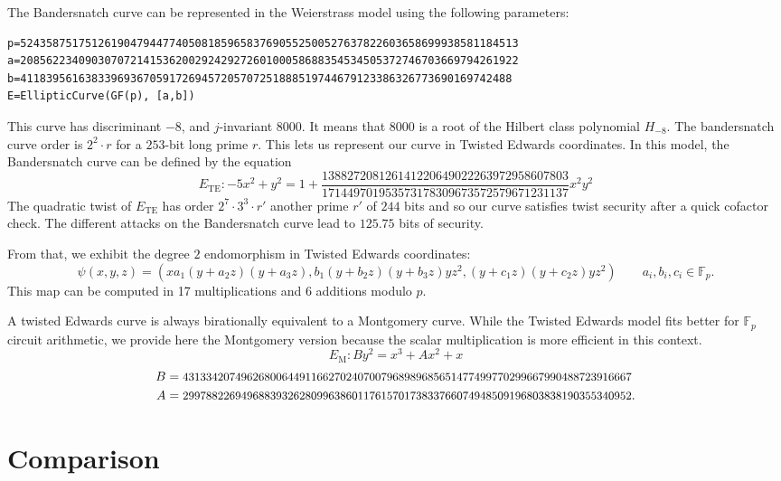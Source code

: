 \documentclass{amsart}
\newcommand{\Fp}{\ensuremath{\mathbb F_p}}
\begin{document}
The Bandersnatch curve can be represented in the Weierstrass model
using the following parameters:
\begin{verbatim}
p=52435875175126190479447740508185965837690552500527637822603658699938581184513
a=20856223409030707214153620029242927260100058688354534505372746703669794261922
b=4118395616383396936705917269457205707251888519744679123386326773690169742488
E=EllipticCurve(GF(p), [a,b])
\end{verbatim}
This curve has discriminant $-8$, and $j$-invariant $8000$. It means
that $8000$ is a root of the Hilbert class polynomial $H_{-8}$.
The bandersnatch curve order is $2^2\cdot r$ for a $253$-bit long
prime $r$.
This lets us represent our curve in Twisted Edwards coordinates.
In this model, the Bandersnatch curve can be defined by the equation
$$E_\text{TE}:-5x^2+y^2 = 1 + \frac{138827208126141220649022263972958607803}{171449701953573178309673572579671231137}x^2y^2$$ 
The quadratic twist of $E_\text{TE}$ has order $2^7 \cdot 3^3 \cdot r'$ another
prime $r'$ of $244$ bits
and so our curve satisfies twist security after a quick cofactor
check.
The different attacks on the Bandersnatch curve lead to $125.75$ bits
of security.

From that, we exhibit the degree $2$ endomorphism in Twisted Edwards
coordinates:
$$\psi(x,y,z) = (xa_1(y+a_2z)(y+a_3z), b_1(y+b_2z)(y+b_3z)yz^2,
(y+c_1z)(y+c_2z)yz^2) \qquad a_i, b_i, c_i \in \Fp.$$
This map can be computed in 17 multiplications and 6 additions modulo $p$.

A twisted Edwards curve is always birationally equivalent to a
Montgomery curve.
While the Twisted Edwards model fits better for $\mathbb F_p$ circuit
arithmetic, we provide here the Montgomery version because the scalar
multiplication is more efficient in this context.
$$E_\text{M}: By^2 = x^3 + Ax^2 + x$$
\begin{align*}
  B &= \text{\small{43133420749626800644911662702407007968989685651477499770299667990488723916667}}\\
  A &= \text{\small{29978822694968839326280996386011761570173833766074948509196803838190355340952}}.
\end{align*}


\section{Comparison}
\end{document}
